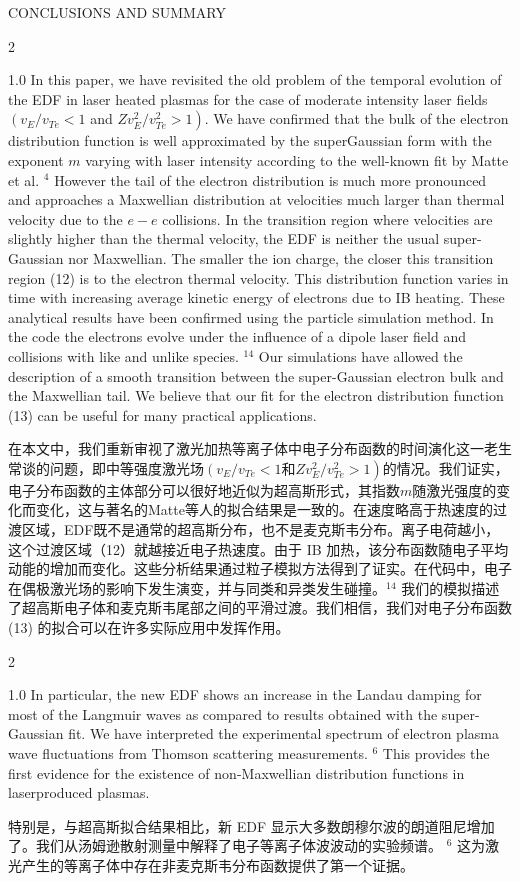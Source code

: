 \documentclass[oneside,onecolumn]{article}
\newcommand\enzhbox[2]{
  	\quad\par \begin{paracol}{2} \colseprulecolor{black} 
  			\begin{spacing}{1.0}
  				\footnotesize  #1
  			\end{spacing}
  		\switchcolumn[1] 
  		#2
  	\end{paracol} 
  }
\begin{document}
\begin{sloppypar}
 {  \small CONCLUSIONS AND SUMMARY\par }
 
\enzhbox{   In this paper, we have revisited the old problem of the temporal evolution of the EDF in laser heated plasmas for the case of moderate intensity laser fields $\left(v_{E} / v_{T e}<1\right.$ and $\left.Z v_{E}^{2} / v_{T e}^{2}>1\right)$. We have confirmed that the bulk of the electron distribution function is well approximated by the superGaussian form with the exponent $m$ varying with laser intensity according to the well-known fit by Matte et al. ${ }^{4}$ However the tail of the electron distribution is much more pronounced and approaches a Maxwellian distribution at velocities much larger than thermal velocity due to the $e-e$ collisions. In the transition region where velocities are slightly higher than the thermal velocity, the EDF is neither the usual super-Gaussian nor Maxwellian. The smaller the ion charge, the closer this transition region (12) is to the electron thermal velocity. This distribution function varies in time with increasing average kinetic energy of electrons due to IB heating. These analytical results have been confirmed using the particle simulation method. In the code the electrons evolve under the influence of a dipole laser field and collisions with like and unlike species. ${ }^{14}$ Our simulations have allowed the description of a smooth transition between the super-Gaussian electron bulk and the Maxwellian tail. We believe that our fit for the electron distribution function (13) can be useful for many practical applications.
}{
在本文中，我们重新审视了激光加热等离子体中电子分布函数的时间演化这一老生常谈的问题，即中等强度激光场$\left(v_{E} / v_{T e}<1\right.$和$\left.Z v_{E}^{2} / v_{T e}^{2}>1\right)$的情况。我们证实，电子分布函数的主体部分可以很好地近似为超高斯形式，其指数$m$随激光强度的变化而变化，这与著名的Matte等人的拟合结果是一致的。在速度略高于热速度的过渡区域，EDF既不是通常的超高斯分布，也不是麦克斯韦分布。离子电荷越小，这个过渡区域（12）就越接近电子热速度。由于 IB 加热，该分布函数随电子平均动能的增加而变化。这些分析结果通过粒子模拟方法得到了证实。在代码中，电子在偶极激光场的影响下发生演变，并与同类和异类发生碰撞。${ }^{14}$ 我们的模拟描述了超高斯电子体和麦克斯韦尾部之间的平滑过渡。我们相信，我们对电子分布函数 (13) 的拟合可以在许多实际应用中发挥作用。

}
  
 
\enzhbox{   In particular, the new EDF shows an increase in the Landau damping for most of the Langmuir waves as compared to results obtained with the super-Gaussian fit. We have interpreted the experimental spectrum of electron plasma wave fluctuations from Thomson scattering measurements. $^{6}$ This provides the first evidence for the existence of non-Maxwellian distribution functions in laserproduced plasmas.
}{
特别是，与超高斯拟合结果相比，新 EDF 显示大多数朗穆尔波的朗道阻尼增加了。我们从汤姆逊散射测量中解释了电子等离子体波波动的实验频谱。 $^{6}$ 这为激光产生的等离子体中存在非麦克斯韦分布函数提供了第一个证据。

}
\end{sloppypar}
\end{document}
